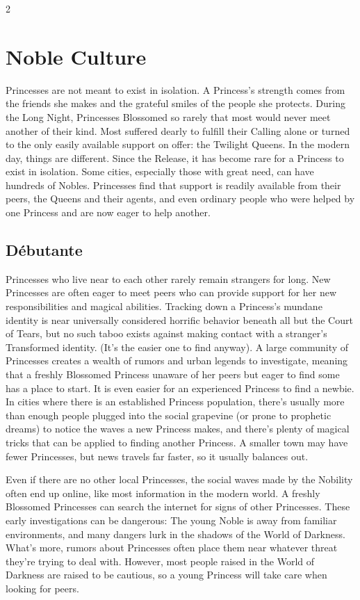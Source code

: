 \begin{multicols}{2}
\section*{Noble Culture}
\label{sec:NobleCulture}

Princesses are not meant to exist in isolation. A Princess's strength comes from the friends she makes and the grateful smiles of the people she protects. During the Long Night, Princesses Blossomed so rarely that most would never meet another of their kind. Most suffered dearly to fulfill their Calling alone or turned to the only easily available support on offer: the Twilight Queens. In the modern day, things are different. Since the Release, it has become rare for a Princess to exist in isolation. Some cities, especially those with great need, can have hundreds of Nobles. Princesses find that support is readily available from their peers, the Queens and their agents, and even ordinary people who were helped by one Princess and are now eager to help another.

\subsection*{D\'ebutante} 

Princesses who live near to each other rarely remain strangers for long. New Princesses are often eager to meet peers who can provide support for her new responsibilities and magical abilities. Tracking down a Princess's mundane identity is near universally considered horrific behavior beneath all but the Court of Tears, but no such taboo exists against making contact with a stranger's Transformed identity. (It's the easier one to find anyway). A large community of Princesses creates a wealth of rumors and urban legends to investigate, meaning that a freshly Blossomed Princess unaware of her peers but eager to find some has a place to start. It is even easier for an experienced Princess to find a newbie. In cities where there is an established Princess population, there's usually more than enough people plugged into the social grapevine (or prone to prophetic dreams) to notice the waves a new Princess makes, and there's plenty of magical tricks that can be applied to finding another Princess. A smaller town may have fewer Princesses, but news travels far faster, so it usually balances out.

Even if there are no other local Princesses, the social waves made by the Nobility often end up online, like most information in the modern world. A freshly Blossomed Princesses can search the internet for signs of other Princesses. These early investigations can be dangerous: The young Noble is away from familiar environments, and many dangers lurk in the shadows of the World of Darkness. What's more, rumors about Princesses often place them near whatever threat they're trying to deal with. However, most people raised in the World of Darkness are raised to be cautious, so a young Princess will take care when looking for peers. 


\end{multicols}
